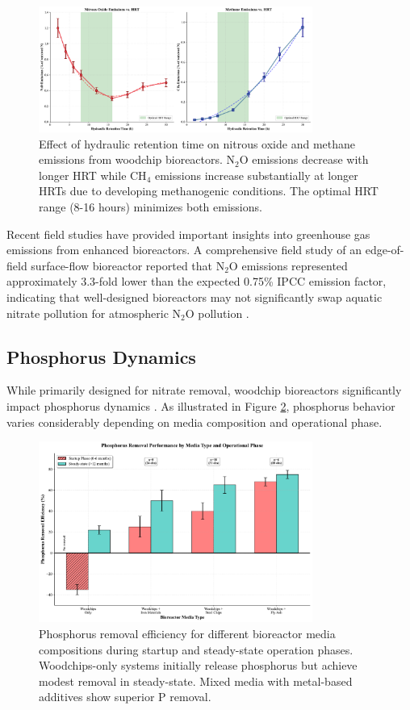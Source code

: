 \documentclass[12pt,a4paper]{article}
\begin{document}
\begin{figure}[ht]
\centering
\includegraphics[width=0.8\textwidth]{fig6_greenhouse_gas_scientific}
\caption{Effect of hydraulic retention time on nitrous oxide and methane emissions from woodchip bioreactors. N$_2$O emissions decrease with longer HRT while CH$_4$ emissions increase substantially at longer HRTs due to developing methanogenic conditions. The optimal HRT range (8-16 hours) minimizes both emissions.}
\label{fig:greenhouse_gas}
\end{figure}

Recent field studies have provided important insights into greenhouse gas emissions from enhanced bioreactors. A comprehensive field study of an edge-of-field surface-flow bioreactor reported that N$_{2}$O emissions represented approximately 3.3-fold lower than the expected 0.75\% IPCC emission factor, indicating that well-designed bioreactors may not significantly swap aquatic nitrate pollution for atmospheric N$_{2}$O pollution \citep{RN1181}.

\subsection{Phosphorus Dynamics}

While primarily designed for nitrate removal, woodchip bioreactors significantly impact phosphorus dynamics \citep{RN282, RN291}. As illustrated in Figure \ref{fig:phosphorus_removal}, phosphorus behavior varies considerably depending on media composition and operational phase.

\begin{figure}[ht]
\centering
\includegraphics[width=0.8\textwidth]{fig7_phosphorus_scientific}
\caption{Phosphorus removal efficiency for different bioreactor media compositions during startup and steady-state operation phases. Woodchips-only systems initially release phosphorus but achieve modest removal in steady-state. Mixed media with metal-based additives show superior P removal.}
\label{fig:phosphorus_removal}
\end{figure}
\end{document}
